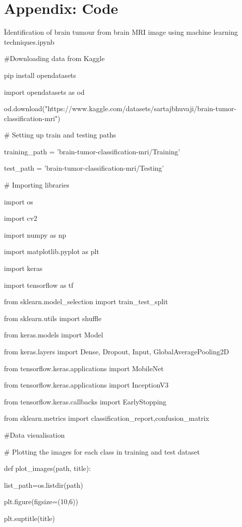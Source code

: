 \documentclass[12pt, a4paper,twoside]{report}
\theoremstyle{plain} %
\theoremstyle{definition} %
\theoremstyle{remark} %
\numberwithin{equation}{chapter}
\begin{document}
\appendix
\chapter{Appendix: Code}
\"Identification of brain tumour from brain MRI image using machine learning techniques.ipynb

\#Downloading data from Kaggle

\!pip install opendatasets

import opendatasets as od

od.download("https://www.kaggle.com/datasets/sartajbhuvaji/brain-tumor-classification-mri")

\# Setting up train and testing paths

training\_path = 'brain-tumor-classification-mri/Training'

test\_path = 'brain-tumor-classification-mri/Testing'

\# Importing libraries

import os

import cv2

import numpy as np

import matplotlib.pyplot as plt

import keras

import tensorflow as tf

from sklearn.model\_selection import train\_test\_split

from sklearn.utils import shuffle

from keras.models import Model

from keras.layers import Dense, Dropout, Input, GlobalAveragePooling2D

from tensorflow.keras.applications import MobileNet

from tensorflow.keras.applications import InceptionV3

from tensorflow.keras.callbacks import EarlyStopping

from sklearn.metrics import classification\_report,confusion\_matrix

\#Data visualisation

\# Plotting the images for each class in training and test dataset

def plot\_images(path, title):

  list\_path=os.listdir(path)
  
  plt.figure(figsize=(10,6))
  
  plt.suptitle(title)
  
\end{document}
